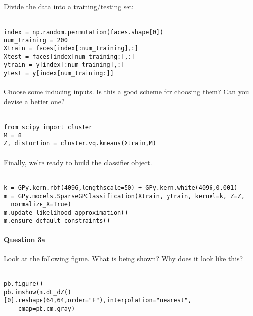 \documentclass{article}
\begin{document}
\paragraph{}
Divide the data into a training/testing set:\\ \ \\
\begin{verbatim}
index = np.random.permutation(faces.shape[0])
num_training = 200
Xtrain = faces[index[:num_training],:]
Xtest = faces[index[num_training:],:]
ytrain = y[index[:num_training],:]
ytest = y[index[num_training:]]
\end{verbatim}

\paragraph{}
Choose some inducing inputs. Is this a good scheme for choosing them? Can you
devise a better one?\\ \ \\
\begin{verbatim}
from scipy import cluster
M = 8
Z, distortion = cluster.vq.kmeans(Xtrain,M)
\end{verbatim}

\paragraph{}
Finally, we're ready to build the classifier object.\\ \ \\
\begin{verbatim}
k = GPy.kern.rbf(4096,lengthscale=50) + GPy.kern.white(4096,0.001)
m = GPy.models.SparseGPClassification(Xtrain, ytrain, kernel=k, Z=Z, 
  normalize_X=True)
m.update_likelihood_approximation()
m.ensure_default_constraints()
\end{verbatim}

\paragraph{Question 3a}
Look at the following figure. What is being shown? Why does it look like this?\\
\ \\
\begin{verbatim}
pb.figure()
pb.imshow(m.dL_dZ()[0].reshape(64,64,order="F"),interpolation="nearest",
    cmap=pb.cm.gray)
\end{verbatim}
\end{document}
